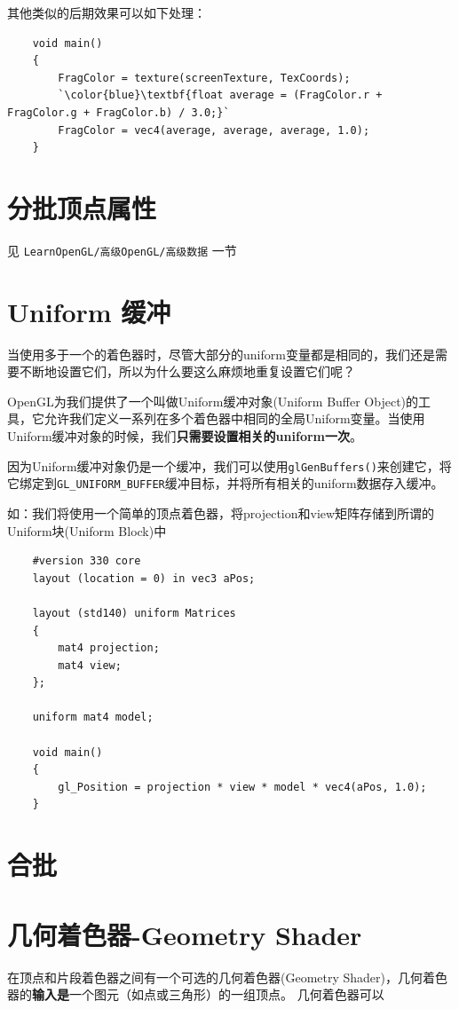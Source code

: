 \documentclass[UTF8,a4paper,12pt]{ctexbook}
\begin{document}
		
			其他类似的后期效果可以如下处理：
			\begin{lstlisting}
	void main()
	{
	    FragColor = texture(screenTexture, TexCoords);
	    `\color{blue}\textbf{float average = (FragColor.r + FragColor.g + FragColor.b) / 3.0;}`
	    FragColor = vec4(average, average, average, 1.0);
	}			
			\end{lstlisting}

	
	
	\section{分批顶点属性}
		见 \verb|LearnOpenGL/高级OpenGL/高级数据| 一节	
	
	
	\section{Uniform 缓冲}
		当使用多于一个的着色器时，尽管大部分的uniform变量都是相同的，我们还是需要不断地设置它们，所以为什么要这么麻烦地重复设置它们呢？
		
		OpenGL为我们提供了一个叫做Uniform缓冲对象(Uniform Buffer Object)的工具，它允许我们定义一系列在多个着色器中相同的全局Uniform变量。当使用Uniform缓冲对象的时候，我们\textbf{只需要设置相关的uniform一次}。
		
		因为Uniform缓冲对象仍是一个缓冲，我们可以使用\verb|glGenBuffers()|来创建它，将它绑定到\verb|GL_UNIFORM_BUFFER|缓冲目标，并将所有相关的uniform数据存入缓冲。
		
		如：我们将使用一个简单的顶点着色器，将projection和view矩阵存储到所谓的Uniform块(Uniform Block)中
		\begin{lstlisting}
	#version 330 core
	layout (location = 0) in vec3 aPos;
	
	layout (std140) uniform Matrices
	{
	    mat4 projection;
	    mat4 view;
	};
	
	uniform mat4 model;
	
	void main()
	{
	    gl_Position = projection * view * model * vec4(aPos, 1.0);
	}		
		\end{lstlisting}
		
	\section{合批}

	
	\section{几何着色器-Geometry Shader}
		在顶点和片段着色器之间有一个可选的几何着色器(Geometry Shader)，几何着色器的\textbf{输入是}一个图元（如点或三角形）的一组顶点。
		几何着色器可以
		
\end{document}
